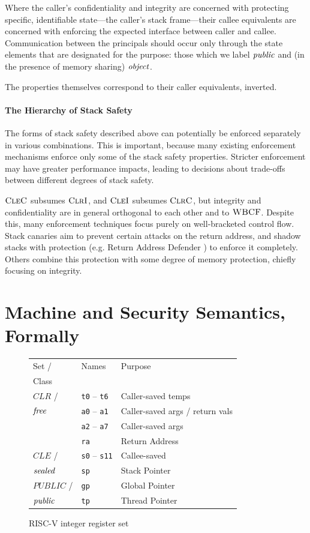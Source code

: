 \documentclass[10pt,conference]{ieeetran}%
\theoremstyle{definition}
\begin{document}
Where the caller's confidentiality and integrity are concerned with protecting specific,
identifiable state---the caller's stack frame---their callee equivalents are concerned
with enforcing the expected interface between caller and callee. Communication between
the principals should occur only through the state elements that are designated for the
purpose: those which we label \(\mathit{public}\) and (in the presence of memory sharing) \(\mathit{object}\).

The properties themselves correspond to their caller equivalents, inverted.

\paragraph*{The Hierarchy of Stack Safety}

The forms of stack safety described above can potentially be enforced separately
in various combinations. This is important, because
many existing enforcement mechanisms enforce only some of the stack safety
properties. Stricter enforcement may have greater performance impacts, leading to decisions
about trade-offs between different degrees of stack safety.

 \(\textnormal{\sc CleC}\) subsumes \(\textnormal{\sc ClrI}\), and \(\textnormal{\sc CleI}\) subsumes
\(\textnormal{\sc ClrC}\), but integrity and confidentiality are in general orthogonal to each other
and to \(\textnormal{\sc WBCF}\). Despite this, many enforcement techniques focus purely on
well-bracketed control flow. Stack canaries aim to prevent certain attacks on the return
address, and shadow stacks with protection (e.g. Return Address Defender \cite{Chiueh2001RAD})
to enforce it completely. Others combine this protection with some degree of memory protection,
chiefly focusing on integrity.

\section{Machine and Security Semantics, Formally}
\label{sec:machine}

\begin{figure}
  \begin{tabular}{| l | l | l |}
    \hline
    Set / & Names & Purpose \\
    Class & & \\
    \hline
    \(\mathit{CLR}\) / & {\tt t0} -- {\tt t6} & Caller-saved temps \\
    \(\mathit{free}\) & {\tt a0} -- {\tt a1} & Caller-saved args / return vals \\
    & {\tt a2} -- {\tt a7} & Caller-saved args \\
    & {\tt ra} & Return Address \\
    \hline
    \(\mathit{CLE}\) / & {\tt s0} -- {\tt s11} & Callee-saved \\
    \(\mathit{sealed}\) & {\tt sp} & Stack Pointer \\
    \hline
    \(\mathit{PUBLIC}\) / & {\tt gp} & Global Pointer  \\
    \(\mathit{public}\) & {\tt tp} & Thread Pointer \\
    \hline
  \end{tabular}
  \caption{RISC-V integer register set}
  \label{fig:RISCVregs}
\end{figure}
\end{document}
